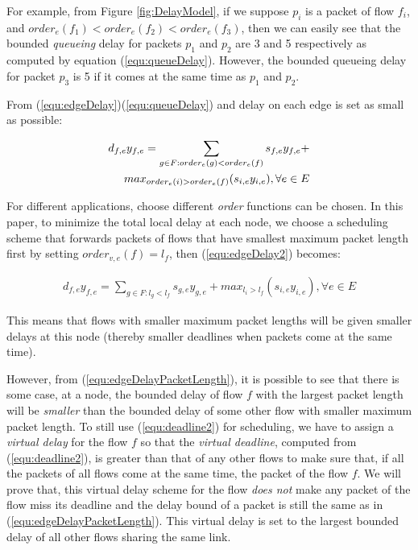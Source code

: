 \documentclass[conference, twocolumn]{IEEEtran}
\theoremstyle{definition}
\begin{document}
For example, from Figure \ref{fig:DelayModel}, if we suppose $p_i$ is a packet
of flow $f_i$, and $order_{e}(f_1) < order_{e}(f_2) < order_{e}(f_3)$, then we can easily see that
the bounded {\em queueing} delay for packets $p_1$ and $p_2$ are 3 and 5
respectively as computed by equation (\ref{equ:queueDelay}). However, the
bounded queueing delay for packet $p_3$ is 5 if it comes at the same time as $p_1$ and $p_2$.

From (\ref{equ:edgeDelay})(\ref{equ:queueDelay}) and delay on
each edge is set as small as possible:

\begin{eqnarray}\label{equ:edgeDelay2}
d_{f,e}y_{f,e} = \sum_{g \in F:order_e(g) < order_e(f)}s_{f,e}y_{f,e} +
\notag\\  
max_{order_{e}(i)>order_{e}(f)}(s_{i,e}y_{i,e}), \forall e \in E
\end{eqnarray}

For different applications, choose different {\em order} functions can be
chosen. In this paper, to minimize the total local delay at each node, we
choose a scheduling scheme that forwards packets of flows that have smallest maximum
packet length first by setting $order_{v,e}(f)=l_f$, then
(\ref{equ:edgeDelay2}) becomes:

\begin{eqnarray}\label{equ:edgeDelayPacketLength}
d_{f,e}y_{f,e} = \sum_{g \in F:l_g <
l_f}s_{g,e}y_{g,e} +max_{l_i>l_f}(s_{i,e}y_{i,e}), \forall e \in E
\end{eqnarray}

This means that flows with smaller maximum packet lengths will be given smaller
delays at this node (thereby smaller deadlines when packets come at the same
time).

However, from (\ref{equ:edgeDelayPacketLength}), it is possible to see that
there is some case, at a node, the bounded delay of flow $f$ with the largest packet length
will be {\em smaller} than the bounded delay of some other flow with smaller
maximum packet length. To still use (\ref{equ:deadline2}) for scheduling, we
have to assign a {\em virtual delay} for the flow $f$ so that the {\em virtual deadline},
computed from (\ref{equ:deadline2}), is greater than that of any other flows to
make sure that, if all the packets of all flows come at the same time, the
packet of the flow $f$. We will prove that, this virtual delay scheme for the
flow {\em does not} make any packet of the flow miss its deadline and the delay
bound of a packet is still the same as in (\ref{equ:edgeDelayPacketLength}).
This virtual delay is set to the largest bounded delay of all other flows
sharing the same link.
\end{document}
